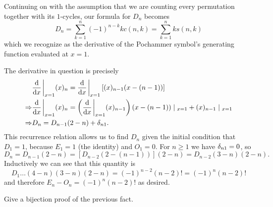 \documentclass[12pt]{memoir}
\begin{document}
\begin{ptcb}
    Continuing on with the assumption that we are counting every permutation together with its $1$-cycles, our formula for $D_n$ becomes 
    $$D_n=\sum_{k=1}^n(-1)^{n-k}kc(n,k)=\sum_{k=1}^nks(n,k)$$
    which we recognize as the derivative of the Pochammer symbol's generating function evaluated at $x=1$.\par 
    The derivative in question is precisely
    \begin{align*}
        &\dv{x}\eval_{x=1}(x)_n=\dv{x}\eval_{x=1}\left\lbrack(x)_{n-1}(x-(n-1))\right\rbrack\\
        \To&\dv{x}\eval_{x=1}(x)_n=\left(\dv{x}\eval_{x=1}(x)_{n-1}\right)(x-(n-1))\mid_{x=1}+(x)_{n-1}\mid_{x=1}\\
        \To&D_n=D_{n-1}(2-n)+\dl_{n1}.
    \end{align*}
    This recurrence relation allows us to find $D_n$ given the initial condition that $D_1=1$, because $E_1=1$ (the identity) and $O_1=0$. For $n\geq 1$ we have $\delta_{n1}=0$, so 
    $$D_n=D_{n-1}(2-n)=[D_{n-2}(2-(n-1))](2-n)=D_{n-2}(3-n)(2-n).$$
    Inductively we can see that this quantity is 
    $$D_1\dots(4-n)(3-n)(2-n)=(-1)^{n-2}(n-2)!=(-1)^n(n-2)!$$
    and therefore $E_n-O_n=(-1)^n(n-2)!$ as desired.
\end{ptcb}

\begin{Ej}
    Give a bijection proof of the previous fact.
\end{Ej}

\begin{ptcbr}
    
\end{ptcbr}
\end{document}
